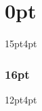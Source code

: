 

% 



\usepackage[left=1in, right=0.5in, top=1in, bottom=0.65in]{geometry}
\usepackage{mathptmx}

\usepackage{titlesec}
\usepackage[scaled=1]{helvet}%
\titlespacing*\section{0pt}{15pt}{4pt}
\titlespacing\subsubsection{16pt}{12pt}{4pt}


